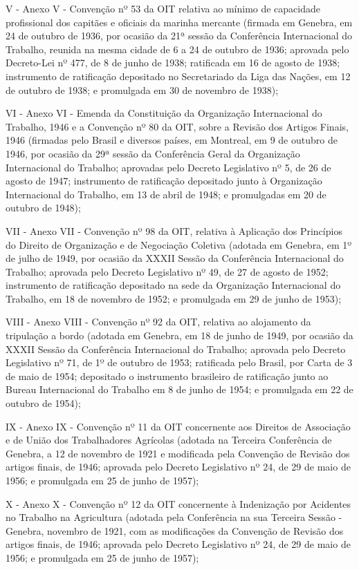 \documentclass[
]{book}
\begin{document}
V - Anexo V - Convenção nº 53 da OIT relativa ao mínimo de capacidade profissional dos capitães e oficiais da marinha mercante (firmada em Genebra, em 24 de outubro de 1936, por ocasião da 21ª sessão da Conferência Internacional do Trabalho, reunida na mesma cidade de 6 a 24 de outubro de 1936; aprovada pelo Decreto-Lei nº 477, de 8 de junho de 1938; ratificada em 16 de agosto de 1938; instrumento de ratificação depositado no Secretariado da Liga das Nações, em 12 de outubro de 1938; e promulgada em 30 de novembro de 1938);

VI - Anexo VI - Emenda da Constituição da Organização Internacional do Trabalho, 1946 e a Convenção nº 80 da OIT, sobre a Revisão dos Artigos Finais, 1946 (firmadas pelo Brasil e diversos países, em Montreal, em 9 de outubro de 1946, por ocasião da 29ª sessão da Conferência Geral da Organização Internacional do Trabalho; aprovadas pelo Decreto Legislativo nº 5, de 26 de agosto de 1947; instrumento de ratificação depositado junto à Organização Internacional do Trabalho, em 13 de abril de 1948; e promulgadas em 20 de outubro de 1948);

VII - Anexo VII - Convenção nº 98 da OIT, relativa à Aplicação dos Princípios do Direito de Organização e de Negociação Coletiva (adotada em Genebra, em 1º de julho de 1949, por ocasião da XXXII Sessão da Conferência Internacional do Trabalho; aprovada pelo Decreto Legislativo nº 49, de 27 de agosto de 1952; instrumento de ratificação depositado na sede da Organização Internacional do Trabalho, em 18 de novembro de 1952; e promulgada em 29 de junho de 1953);

VIII - Anexo VIII - Convenção nº 92 da OIT, relativa ao alojamento da tripulação a bordo (adotada em Genebra, em 18 de junho de 1949, por ocasião da XXXII Sessão da Conferência Internacional do Trabalho; aprovada pelo Decreto Legislativo nº 71, de 1º de outubro de 1953; ratificada pelo Brasil, por Carta de 3 de maio de 1954; depositado o instrumento brasileiro de ratificação junto ao Bureau Internacional do Trabalho em 8 de junho de 1954; e promulgada em 22 de outubro de 1954);

IX - Anexo IX - Convenção nº 11 da OIT concernente aos Direitos de Associação e de União dos Trabalhadores Agrícolas (adotada na Terceira Conferência de Genebra, a 12 de novembro de 1921 e modificada pela Convenção de Revisão dos artigos finais, de 1946; aprovada pelo Decreto Legislativo nº 24, de 29 de maio de 1956; e promulgada em 25 de junho de 1957);

X - Anexo X - Convenção nº 12 da OIT concernente à Indenização por Acidentes no Trabalho na Agricultura (adotada pela Conferência na sua Terceira Sessão - Genebra, novembro de 1921, com as modificações da Convenção de Revisão dos artigos finais, de 1946; aprovada pelo Decreto Legislativo nº 24, de 29 de maio de 1956; e promulgada em 25 de junho de 1957);
\end{document}

